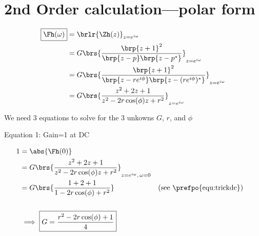 \section{2nd Order  calculation---polar form}
  
{\begin{align*}
  \boxed{\Fh(\omega)}
    &= \brlr{\Zh(z)}_{z=e^{i\omega}}
  \\&= G\brs{\frac{\brp{z+1}^2}
                  {\brp{z-p}\brp{z-p^\ast}}}_{z=e^{i\omega}}
  \\&= G\brs{\frac{\brp{z+1}^2}
                  {\brp{z-re^{i\phi}}\brp{z-(re^{i\phi})^\ast}}}_{z=e^{i\omega}}
  \\&= G\brs{\frac{z^2 + 2z + 1}
                  {z^2 - 2r\cos(\phi)z + r^2}
            }_{z=e^{i\omega}}
\end{align*}}
 
We need 3 equations to solve for the 3 unkowns $G$, $r$, and $\phi$
  
 
Equation 1: Gain=1 at DC
 
\begin{align*}
  1 &= \abs{\Fh(0)}
  \\&= G\brs{\frac{z^2 + 2z            + 1}
                  {z^2 - 2r\cos(\phi)z + r^2}}_{z=e^{i\omega},\,\omega=0}
  \\&= G\brs{\frac{1   + 2             + 1}
                  {1   - 2r\cos(\phi)  + r^2}}
    && \text{(see \prefpo{equ:trickdc})}
  \\
  \\&\implies \boxed{G = \frac{r^2 - 2r\cos(\phi) + 1}{4}}
\end{align*}
  

